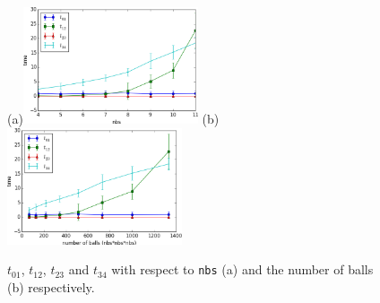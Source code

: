 \documentclass[twoside,11pt]{article}
\newcommand{\nbs}{\texttt{nbs}}
\begin{document}
\begin{figure}[h]
  \centering
  (a)\includegraphics[width=0.46\textwidth]{nbsTime}
  (b)\includegraphics[width=0.46\textwidth]{nbs3Time}
  \caption{$t_{01}$, $t_{12}$, $t_{23}$ and $t_{34}$ with respect to \nbs 
    (a) and the number of balls (b) respectively.}
  \label{fig:time}
\end{figure}
\end{document}
